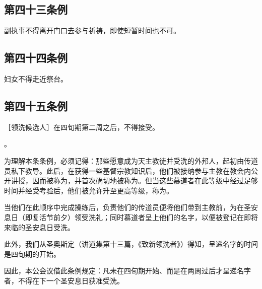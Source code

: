 
\subsection{第四十三条例}

副执事不得离开门口去参与祈祷，即使短暂时间也不可。\par


\subsection{第四十四条例}

妇女不得走近祭台。\par


\subsection{第四十五条例}

［领洗候选人］在四旬期第二周之后，不得接受。\par

。\par

为理解本条条例，必须记得：那些愿意成为天主教徒并受洗的外邦人，起初由传道员私下教导。此后，在获得一些基督宗教知识后，他们被接纳参与主教在教会内公开讲授，因而被称为，并首次确切地被称为。但当这些慕道者在此等级中经过足够时间并经受考验后，他们被允许升至更高等级，称为。\par

当他们在此顺序中完成操练后，负责他们的传道员便将他们带到主教前，为在圣安息日（即复活节前夕）领受洗礼；同时慕道者呈上他们的名字，以便被登记在即将来临的圣安息日受洗。\par

此外，我们从圣奥斯定（讲道集第十三篇，《致新领洗者》）得知，呈递名字的时间是四旬期的开始。\par

因此，本公会议借此条例规定：凡未在四旬期开始、而是在两周过后才呈递名字者，不得在下一个圣安息日获准受洗。\par

